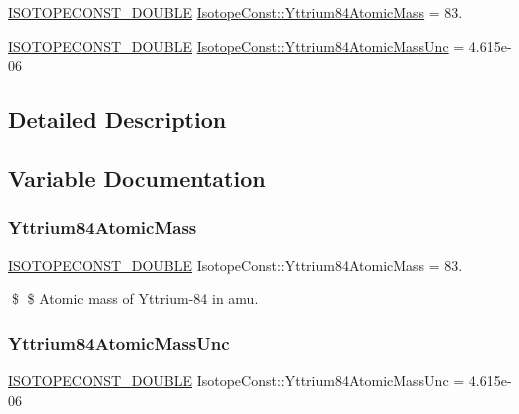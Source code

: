 \begin{DoxyCompactItemize}
\item 
\mbox{\hyperlink{group___isotope_const-_macros_ga8f45a7272ce02c0b4c65c44636ed719a}{I\+S\+O\+T\+O\+P\+E\+C\+O\+N\+S\+T\+\_\+\+D\+O\+U\+B\+LE}} \mbox{\hyperlink{group___isotope_const-_yttrium-_y84_ga92dc6ca3b1529db81d5ece1c79c2864f}{Isotope\+Const\+::\+Yttrium84\+Atomic\+Mass}} = 83.
\item 
\mbox{\hyperlink{group___isotope_const-_macros_ga8f45a7272ce02c0b4c65c44636ed719a}{I\+S\+O\+T\+O\+P\+E\+C\+O\+N\+S\+T\+\_\+\+D\+O\+U\+B\+LE}} \mbox{\hyperlink{group___isotope_const-_yttrium-_y84_ga3d199f169123619767e0152610ae8168}{Isotope\+Const\+::\+Yttrium84\+Atomic\+Mass\+Unc}} = 4.\+615e-\/06
\end{DoxyCompactItemize}


\subsection{Detailed Description}


\subsection{Variable Documentation}
\mbox{\label{group___isotope_const-_yttrium-_y84_ga92dc6ca3b1529db81d5ece1c79c2864f}} 
\subsubsection{\texorpdfstring{Yttrium84\+Atomic\+Mass}{Yttrium84AtomicMass}}
{\footnotesize\ttfamily \mbox{\hyperlink{group___isotope_const-_macros_ga8f45a7272ce02c0b4c65c44636ed719a}{I\+S\+O\+T\+O\+P\+E\+C\+O\+N\+S\+T\+\_\+\+D\+O\+U\+B\+LE}} Isotope\+Const\+::\+Yttrium84\+Atomic\+Mass = 83.}

\$ \$ Atomic mass of Yttrium-\/84 in amu. \mbox{\label{group___isotope_const-_yttrium-_y84_ga3d199f169123619767e0152610ae8168}} 
\subsubsection{\texorpdfstring{Yttrium84\+Atomic\+Mass\+Unc}{Yttrium84AtomicMassUnc}}
{\footnotesize\ttfamily \mbox{\hyperlink{group___isotope_const-_macros_ga8f45a7272ce02c0b4c65c44636ed719a}{I\+S\+O\+T\+O\+P\+E\+C\+O\+N\+S\+T\+\_\+\+D\+O\+U\+B\+LE}} Isotope\+Const\+::\+Yttrium84\+Atomic\+Mass\+Unc = 4.\+615e-\/06}

